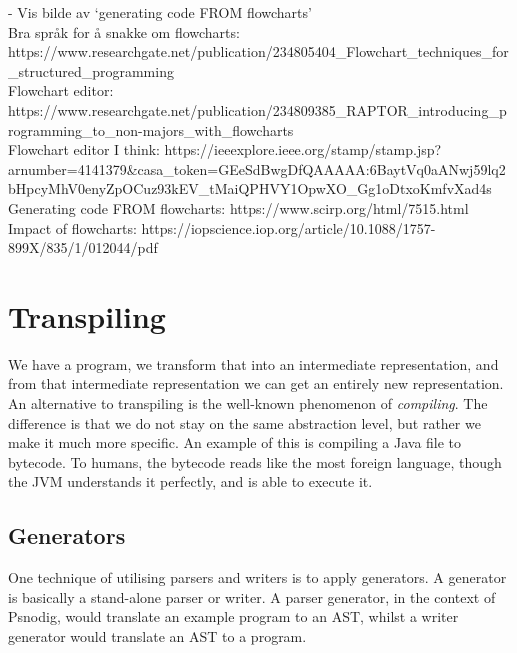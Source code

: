 - Vis bilde av ‘generating code FROM flowcharts' \\

Bra språk for å snakke om flowcharts: https://www.researchgate.net/publication/234805404\_Flowchart\_techniques\_for\_structured\_programming \\

Flowchart editor: https://www.researchgate.net/publication/234809385\_RAPTOR\_introducing\_programming\_to\_non-majors\_with\_flowcharts \\

Flowchart editor I think: https://ieeexplore.ieee.org/stamp/stamp.jsp?arnumber=4141379\&casa\_token=GEeSdBwgDfQAAAAA:6BaytVq0aANwj59lq2bHpcyMhV0enyZpOCuz93kEV\_tMaiQPHVY1OpwXO\_Gg1oDtxoKmfvXad4s \\

Generating code FROM flowcharts: https://www.scirp.org/html/7515.html \\

Impact of flowcharts: https://iopscience.iop.org/article/10.1088/1757-899X/835/1/012044/pdf

\section{Transpiling}
We have a program, we transform that into an intermediate representation, and from that intermediate representation we can get an entirely new representation. \hfill \\

An alternative to transpiling is the well-known phenomenon of \textit{compiling}. The difference is that we do not stay on the same abstraction level, but rather we make it much more specific. An example of this is compiling a Java file to bytecode. To humans, the bytecode reads like the most foreign language, though the JVM understands it perfectly, and is able to execute it. \hfill \\

\subsection{Generators}
One technique of utilising parsers and writers is to apply generators. A generator is basically a stand-alone parser or writer. A parser generator, in the context of Psnodig, would translate an example program to an AST, whilst a writer generator would translate an AST to a program. \hfill \\

